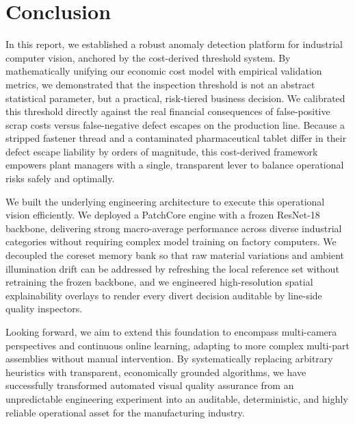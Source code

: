 \section{Conclusion}
\label{sec:conclusion}

In this report, we established a robust anomaly detection platform for industrial computer vision, anchored by the cost-derived threshold system. By mathematically unifying our economic cost model with empirical validation metrics, we demonstrated that the inspection threshold is not an abstract statistical parameter, but a practical, risk-tiered business decision. We calibrated this threshold directly against the real financial consequences of false-positive scrap costs versus false-negative defect escapes on the production line. Because a stripped fastener thread and a contaminated pharmaceutical tablet differ in their defect escape liability by orders of magnitude, this cost-derived framework empowers plant managers with a single, transparent lever to balance operational risks safely and optimally.

We built the underlying engineering architecture to execute this operational vision efficiently. We deployed a PatchCore engine with a frozen ResNet-18 backbone, delivering strong macro-average performance across diverse industrial categories without requiring complex model training on factory computers. We decoupled the coreset memory bank so that raw material variations and ambient illumination drift can be addressed by refreshing the local reference set without retraining the frozen backbone, and we engineered high-resolution spatial explainability overlays to render every divert decision auditable by line-side quality inspectors.

Looking forward, we aim to extend this foundation to encompass multi-camera perspectives and continuous online learning, adapting to more complex multi-part assemblies without manual intervention. By systematically replacing arbitrary heuristics with transparent, economically grounded algorithms, we have successfully transformed automated visual quality assurance from an unpredictable engineering experiment into an auditable, deterministic, and highly reliable operational asset for the manufacturing industry.
